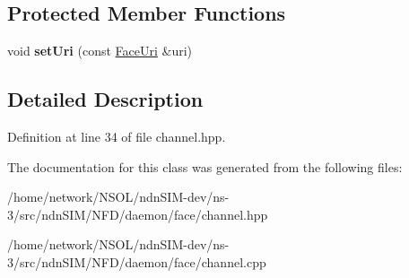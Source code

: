 \subsection*{Protected Member Functions}
\begin{DoxyCompactItemize}
\item 
void {\bfseries set\+Uri} (const \hyperlink{classndn_1_1util_1_1FaceUri}{Face\+Uri} \&uri)\hypertarget{classnfd_1_1Channel_abcf554a6fe1e36b3d1d600afc67a36cd}{}\label{classnfd_1_1Channel_abcf554a6fe1e36b3d1d600afc67a36cd}

\end{DoxyCompactItemize}


\subsection{Detailed Description}


Definition at line 34 of file channel.\+hpp.



The documentation for this class was generated from the following files\+:\begin{DoxyCompactItemize}
\item 
/home/network/\+N\+S\+O\+L/ndn\+S\+I\+M-\/dev/ns-\/3/src/ndn\+S\+I\+M/\+N\+F\+D/daemon/face/channel.\+hpp\item 
/home/network/\+N\+S\+O\+L/ndn\+S\+I\+M-\/dev/ns-\/3/src/ndn\+S\+I\+M/\+N\+F\+D/daemon/face/channel.\+cpp\end{DoxyCompactItemize}
